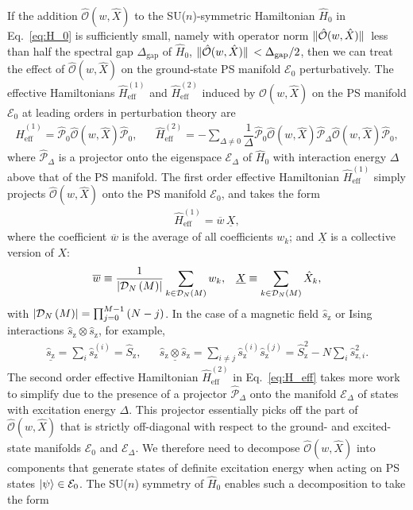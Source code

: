 \documentclass[aps,pra,nofootinbib,twocolumn,superscriptaddress]{revtex4-2}
\renewcommand{\t}{\text} %
\newcommand{\f}[2]{\dfrac{#1}{#2}} %
\newcommand{\p}[1]{\left(#1\right)} %
\newcommand{\1}{\mathds{1}}
\newcommand{\s}{\hat s}
\renewcommand{\H}{\hat H}
\renewcommand{\S}{\hat S}
\renewcommand{\O}{\hat{\mathcal{O}}}
\renewcommand{\P}{\hat{\mathcal{P}}}
\newcommand{\z}{\text{z}}
\newcommand{\D}{\mathcal{D}}
\newcommand{\E}{\mathcal{E}}
\newcommand{\eff}{\text{eff}}
\newcommand{\col}{\underline}
\newcommand{\mean}{\overline}
\begin{document}
If the addition $\O(w,\hat X)$ to the SU($n$)-symmetric Hamiltonian $\H_0$ in Eq.~\eqref{eq:H_0} is sufficiently small, namely with operator norm $\norm*{\O(w,\hat X)}$ less than half the spectral gap $\Delta_{\t{gap}}$ of $\H_0$, $\norm*{\O(w,\hat X)}<\Delta_{\t{gap}}/2$, then we can treat the effect of $\O(w,\hat X)$ on the ground-state PS manifold $\E_0$ perturbatively.
The effective Hamiltonians $\H_\eff^{(1)}$ and $\H_\eff^{(2)}$ induced by $\O(w,\hat X)$ on the PS manifold $\E_0$ at leading orders in perturbation theory are \cite{bravyi2011schrieffer}
\begin{align}
  \H_\eff^{(1)} = \P_0 \O(w,\hat X) \P_0,
  &&
  \H_\eff^{(2)} = - \sum_{\Delta\ne0}
  \f1\Delta \P_0 \O(w,\hat X) \P_\Delta \O(w,\hat X) \P_0,
  \label{eq:H_eff}
\end{align}
where $\P_\Delta$ is a projector onto the eigenspace $\E_\Delta$ of $\H_0$ with interaction energy $\Delta$ above that of the PS manifold.
The first order effective Hamiltonian $\H_\eff^{(1)}$ simply projects $\O(w,\hat X)$ onto the PS manifold $\E_0$, and takes the form
\begin{align}
  \H_\eff^{(1)} = \mean w \, \col X,
  \label{eq:H_eff_1}
\end{align}
where the coefficient $\mean w$ is the average of all coefficients $w_k$; and $\col X$ is a collective version of $X$:
\begin{align}
  \mean w \equiv \f1{\abs{\D_N\p{M}}}
  \sum_{k\in\D_N\p{M}} w_k,
  &&
  \col X \equiv \sum_{k\in\D_N\p{M}} \hat X_k,
  \label{eq:mean_col}
\end{align}
with $\abs{\D_N\p{M}}=\prod_{j=0}^{M-1}\p{N-j}$.
In the case of a magnetic field $\s_\z$ or Ising interactions  $\s_\z\otimes \s_\z$, for example,
\begin{align}
  \col{\s_\z} = \sum_i \s_\z^{(i)} = \S_\z,
  &&
  \col{\s_\z\otimes \s_\z}
  = \sum_{i\ne j} \s_\z^{(i)} \s_\z^{(j)}
  = \S_\z^2 - N \sum_i \s_{\z,i}^2.
\end{align}
The second order effective Hamiltonian $\H_\eff^{(2)}$ in Eq.~\eqref{eq:H_eff} takes more work to simplify due to the presence of a projector $\P_\Delta$ onto the manifold $\E_\Delta$ of states with excitation energy $\Delta$.
This projector essentially picks off the part of $\O(w,\hat X)$ that is strictly off-diagonal with respect to the ground- and excited-state manifolds $\E_0$ and $\E_\Delta$.
We therefore need to decompose $\O(w,\hat X)$ into components that generate states of definite excitation energy when acting on PS states $\ket\psi\in\E_0$.
The SU($n$) symmetry of $\H_0$ enables such a decomposition to take the form
\end{document}
